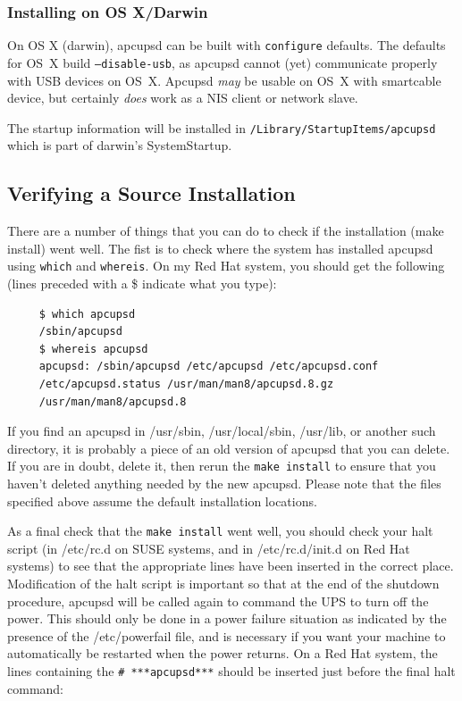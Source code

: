 \label{Installing-on-OSX}
\subsubsection*{Installing on OS X/Darwin}

On OS X (darwin), apcupsd can be built with \texttt{configure} defaults.
The defaults for OS~X build \texttt{{---}disable-usb}, as apcupsd cannot
(yet) communicate properly with USB devices on OS~X\@.  Apcupsd
\emph{may} be usable on OS~X with smartcable device, but certainly
\emph{does} work as a NIS client or network slave.

The startup information will be installed in
\texttt{/Library/StartupItems/apcupsd} which is part of darwin's
SystemStartup.

\label{Verifying-a-Source-Installation}

\subsection*{Verifying a Source Installation}

\label{index-Verifying-Source-22}
\label{index-Installing_002c-Source-23}
There are a number of things that you can do to check if the installation
(make install) went well. The fist is to check where the system has installed
apcupsd using {\tt which} and {\tt whereis}. On my Red Hat system, you should
get the following (lines preceded with a \$ indicate what you type): 

\footnotesize
\begin{verbatim}
     $ which apcupsd
     /sbin/apcupsd
     $ whereis apcupsd
     apcupsd: /sbin/apcupsd /etc/apcupsd /etc/apcupsd.conf
     /etc/apcupsd.status /usr/man/man8/apcupsd.8.gz
     /usr/man/man8/apcupsd.8
\end{verbatim}
\normalsize

If you find an apcupsd in /usr/sbin, /usr/local/sbin, /usr/lib, or another
such directory, it is probably a piece of an old version of apcupsd that you
can delete. If you are in doubt, delete it, then rerun the {\tt make install}
to ensure that you haven't deleted anything needed by the new apcupsd.  Please
note that the files specified above assume the default installation locations.
 

As a final check that the {\tt make install} went well, you should check your
halt script (in /etc/rc.d on SUSE systems, and in /etc/rc.d/init.d on Red Hat
systems) to see that the appropriate lines have been inserted in the correct
place. Modification of the halt script is important so that at the end of the
shutdown procedure, apcupsd will be called again to command the UPS to turn
off the power. This should only be done in a power failure situation as
indicated by the presence of the /etc/powerfail file, and is necessary if you
want your machine to automatically be restarted when the power returns. On a
Red Hat system, the lines containing the {\tt \# ***apcupsd***} should be
inserted just before the final halt command: 

